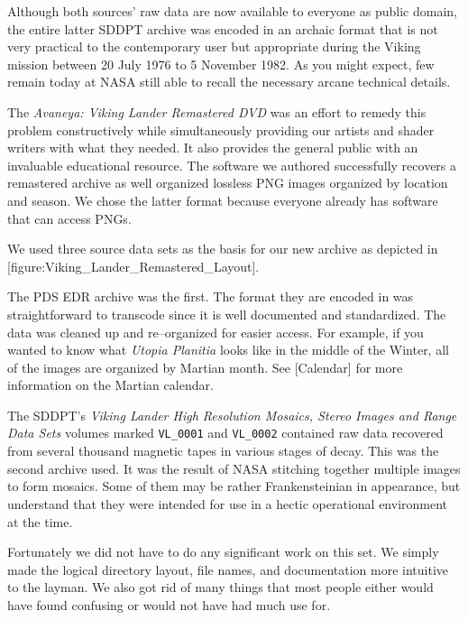 Although both sources' raw data are now available to everyone as public domain, the entire latter SDDPT archive was encoded in an archaic format that is not very practical to the contemporary user but appropriate during the Viking mission between 20 July 1976 to 5 November 1982. As you might expect, few remain today at NASA still able to recall the necessary arcane technical details.

The {\it Avaneya: Viking Lander Remastered DVD} was an effort to remedy this problem constructively while simultaneously providing our artists and shader writers with what they needed. It also provides the general public with an invaluable educational resource. The software we authored successfully recovers a remastered archive as well organized lossless PNG images organized by location and season. We chose the latter format because everyone already has software that can access PNGs.

We used three source data sets as the basis for our new archive as depicted in [figure:Viking_Lander_Remastered_Layout].
\crlf

\vfill
{}
    {}
\vfill

The PDS EDR archive was the first. The format they are encoded in was straightforward to transcode since it is well documented and standardized. The data was cleaned up and re--organized for easier access. For example, if you wanted to know what {\it Utopia Planitia} looks like in the middle of the Winter, all of the images are organized by Martian month. See [Calendar] for more information on the Martian calendar.

The SDDPT's {\it Viking Lander High Resolution Mosaics, Stereo Images and Range Data Sets} volumes marked {\tt VL_0001} and {\tt VL_0002} contained raw data recovered from several thousand magnetic tapes in various stages of decay. This was the second archive used. It was the result of NASA stitching together multiple images to form mosaics. Some of them may be rather Frankensteinian in appearance, but understand that they were intended for use in a hectic operational environment at the time. 

Fortunately we did not have to do any significant work on this set. We simply made the logical directory layout, file names, and documentation more intuitive to the layman. We also got rid of many things that most people either would have found confusing or would not have had much use for.

